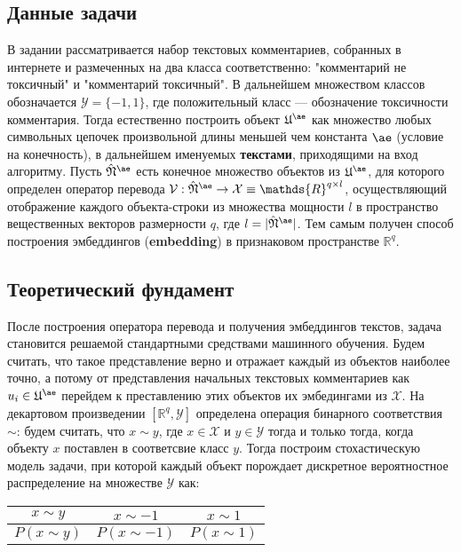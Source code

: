 \documentclass{article}
\begin{document}
    \subsection{Данные задачи}

    В задании рассматривается набор текстовых комментариев, собранных в интернете и размеченных на два класса соответственно: "комментарий не токсичный" и "комментарий токсичный". В дальнейшем множеством классов обозначается $\mathcal{Y}=\{-1, 1\}$, где положительный класс — обозначение токсичности комментария. Тогда естественно построить объект $\mathfrak{U}^{\ae}$ как множество любых символьных цепочек произвольной длины меньшей чем константа $\ae$ (условие на конечность), в дальнейшем именуемых \textbf{текстами}, приходящими на вход алгоритму. Пусть $\hat{\mathfrak{N}}^{\ae}$ есть конечное множество объектов из $\mathfrak{U}^{\ae}$, для которого определен оператор перевода $\mathcal{V}: \hat{\mathfrak{N}}^{\ae} \rightarrow \mathcal{X} \equiv \mathds{R}^{q \times l}$, осуществляющий отображение каждого объекта-строки из множества мощности $l$ в пространство вещественных векторов размерности $q$, где $l=|\hat{\mathfrak{N}}^{\ae}|$. Тем самым получен способ построения эмбеддингов (\textbf{embedding}) в признаковом пространстве $\mathds{R}^q$. 

    \subsection{Теоретический фундамент}

    После построения оператора перевода и получения эмбеддингов текстов, задача становится решаемой стандартными средствами машинного обучения. Будем считать, что такое представление верно и отражает каждый из объектов наиболее точно, а потому от представления начальных текстовых комментариев как $u_i \in \mathfrak{U}^{\ae}$ перейдем к преставлению этих объектов их эмбедингами из $\mathcal{X}$. На декартовом произведении $[\mathds{R}^q, \mathcal{Y}]$ определена операция бинарного соответствия $\sim$: будем считать, что $x \sim y$, где $x \in \mathcal{X}$ и $ y \in \mathcal{Y} $ тогда и только тогда, когда объекту $x$ поставлен в соответсвие класс $y$. Тогда построим стохастическую модель задачи, при которой каждый объект порождает дискретное вероятностное распределение на множестве $\mathcal{Y}$ как:

    \begin{center}
        \begin{tabular}{ c|c|c } 
             $x \sim y$ & $x \sim -1$ & $x \sim 1$ \\
             \hline
             $P(x \sim y)$ & $P(x \sim -1)$ & $P(x \sim 1)$\\
        \end{tabular}
    \end{center}
    
\end{document}
